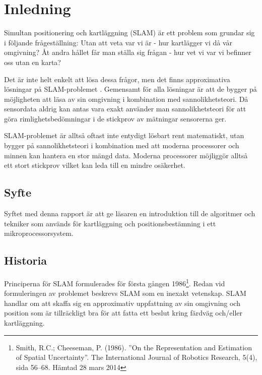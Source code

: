 \documentclass[a4paper,12pt,fleqn]{article}
\begin{document}
\addto\captionsswedish{\renewcommand{\contentsname}{Innehållsförteckning}}

\tableofcontents
\thispagestyle{fancy}
\newpage


\section{Inledning}

Simultan positionering och kartläggning (SLAM) är ett problem som grundar sig i följande frågeställning: Utan att veta var vi är - hur kartlägger vi då vår omgivning? Åt andra hållet får man ställa sig frågan - hur vet vi var vi befinner oss utan en karta?

Det är inte helt enkelt att lösa dessa frågor, men det finns approximativa lösningar på SLAM-problemet . Gemensamt för alla lösningar är att de bygger på möjligheten att läsa av sin omgivning i kombination med
sannolikhetsteori. Då sensordata aldrig kan antas vara exakt använder man sannolikhetsteori för att göra rimlighetsbedömningar i de stickprov av mätningar sensorerna ger.

SLAM-problemet är alltså oftast inte entydigt lösbart rent matematiskt, utan
bygger på sannolikhetsteori i kombination med att moderna processorer
och minnen kan hantera en stor mängd data. Moderna processorer möjliggör
alltså ett stort stickprov vilket kan leda till en mindre osäkerhet.


\subsection{Syfte}
Syftet med denna rapport är att ge läsaren en introduktion till de algoritmer och tekniker som används för kartläggning och positionsbestämning i ett mikroprocessorsystem.

\subsection{Historia}

Principerna för SLAM formulerades för första gången 1986\footnote{Smith, R.C.; Cheeseman, P. (1986).
''On the Representation and Estimation of Spatial Uncertainty''. The
International Journal of Robotics Research, 5(4), sida 56–68. Hämtad 28 mars 2014}. Redan vid formuleringen av problemet beskrevs SLAM som en inexakt vetenskap. SLAM handlar om att skaffa sig en approximativ uppfattning av sin omgivning och position som är tillräckligt bra för att fatta ett beslut kring färdväg och/eller kartläggning. 
\end{document}
